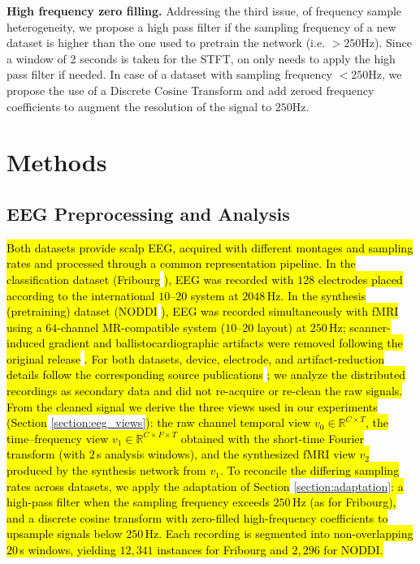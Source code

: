 \documentclass{article}
\begin{document}
\noindent\textbf{High frequency zero filling.}\label{appendix:high_pass} 
Addressing the third issue, of frequency sample heterogeneity, we propose a high pass filter if the sampling frequency of a new dataset is higher than the one used to pretrain the network (i.e. $> 250$Hz). Since a window of 2 seconds is taken for the STFT, on only needs to apply the high pass filter if needed. In case of a dataset with sampling frequency $< 250$Hz, we propose the use of a Discrete Cosine Transform and add zeroed frequency coefficients to augment the resolution of the signal to $250$Hz.

\section{Methods}\label{section:methods}

\subsection{EEG Preprocessing and Analysis}

\hl{Both datasets provide scalp EEG, acquired with different montages and sampling rates and processed through a common representation pipeline. In the classification dataset (Fribourg }\cite{dataset2022fribourg}\hl{), EEG was recorded with $128$ electrodes placed according to the international $10$--$20$ system at $2048$\,Hz. In the synthesis (pretraining) dataset (NODDI }\cite{dataset_01}\hl{), EEG was recorded simultaneously with fMRI using a $64$-channel MR-compatible system ($10$--$20$ layout) at $250$\,Hz; scanner-induced gradient and ballistocardiographic artifacts were removed following the original release }\cite{dataset_01}\hl{. For both datasets, device, electrode, and artifact-reduction details follow the corresponding source publications }\cite{dataset2022fribourg,dataset_01}\hl{; we analyze the distributed recordings as secondary data and did not re-acquire or re-clean the raw signals. From the cleaned signal we derive the three views used in our experiments (Section }\ref{section:eeg_views}\hl{): the raw channel temporal view $v_0 \in \mathbb{R}^{C \times T}$, the time--frequency view $v_1 \in \mathbb{R}^{C \times F \times T}$ obtained with the short-time Fourier transform (with $2$\,s analysis windows), and the synthesized fMRI view $v_2$ produced by the synthesis network from $v_1$. To reconcile the differing sampling rates across datasets, we apply the adaptation of Section }\ref{section:adaptation}\hl{: a high-pass filter when the sampling frequency exceeds $250$\,Hz (as for Fribourg), and a discrete cosine transform with zero-filled high-frequency coefficients to upsample signals below $250$\,Hz. Each recording is segmented into non-overlapping $20$\,s windows, yielding $12{,}341$ instances for Fribourg and $2{,}296$ for NODDI.}
\end{document}
